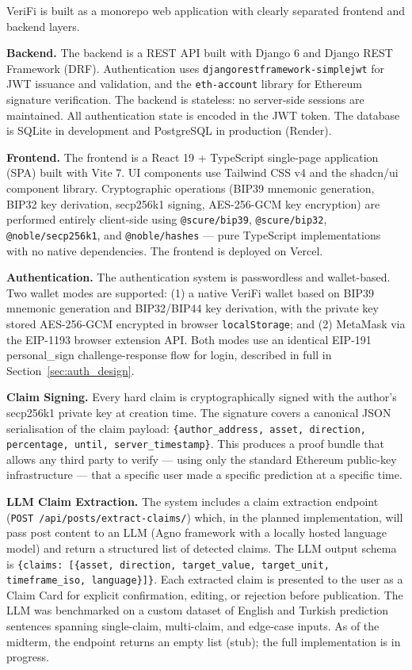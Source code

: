 \documentclass[a4paper,12pt]{report}
\begin{document}
VeriFi is built as a monorepo web application with clearly separated frontend and backend layers.

\begin{sloppypar}
\textbf{Backend.} The backend is a REST API built with Django 6 and Django REST Framework (DRF). Authentication uses \texttt{djangorestframework-simplejwt} for JWT issuance and validation, and the \texttt{eth-account} library for Ethereum signature verification. The backend is stateless: no server-side sessions are maintained. All authentication state is encoded in the JWT token. The database is SQLite in development and PostgreSQL in production (Render).
\end{sloppypar}

\textbf{Frontend.} The frontend is a React 19 + TypeScript single-page application (SPA) built with Vite 7. UI components use Tailwind CSS v4 and the shadcn/ui component library. Cryptographic operations (BIP39 mnemonic generation, BIP32 key derivation, secp256k1 signing, AES-256-GCM key encryption) are performed entirely client-side using \texttt{@scure/bip39}, \texttt{@scure/bip32}, \texttt{@noble/secp256k1}, and \texttt{@noble/hashes} --- pure TypeScript implementations with no native dependencies. The frontend is deployed on Vercel.

\textbf{Authentication.} The authentication system is passwordless and wallet-based. Two wallet modes are supported: (1) a native VeriFi wallet based on BIP39 mnemonic generation and BIP32/BIP44 key derivation, with the private key stored AES-256-GCM encrypted in browser \texttt{localStorage}; and (2) MetaMask via the EIP-1193 browser extension API. Both modes use an identical EIP-191 personal\_sign challenge-response flow for login, described in full in Section~\ref{sec:auth_design}.

\textbf{Claim Signing.} Every hard claim is cryptographically signed with the author's secp256k1 private key at creation time. The signature covers a canonical JSON serialisation of the claim payload: \texttt{\{author\_address, asset, direction, percentage, until, server\_timestamp\}}. This produces a proof bundle that allows any third party to verify --- using only the standard Ethereum public-key infrastructure --- that a specific user made a specific prediction at a specific time.

\textbf{LLM Claim Extraction.} The system includes a claim extraction endpoint (\texttt{POST /api/posts/extract-claims/}) which, in the planned implementation, will pass post content to an LLM (Agno framework with a locally hosted language model) and return a structured list of detected claims. The LLM output schema is \texttt{\{claims: [\{asset, direction, target\_value, target\_unit, timeframe\_iso, language\}]\}}. Each extracted claim is presented to the user as a Claim Card for explicit confirmation, editing, or rejection before publication. The LLM was benchmarked on a custom dataset of English and Turkish prediction sentences spanning single-claim, multi-claim, and edge-case inputs. As of the midterm, the endpoint returns an empty list (stub); the full implementation is in progress.
\end{document}
